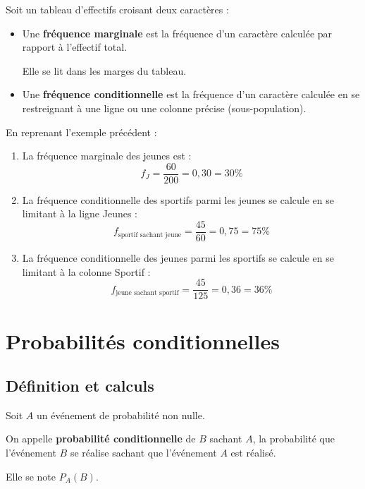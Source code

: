 \begin{defin}
	Soit un tableau d'effectifs croisant deux caractères :
	\begin{itemize}
		\item Une \textbf{fréquence marginale} est la fréquence d'un caractère calculée par rapport à l'effectif total.

		      Elle se lit dans les marges du tableau.
		\item Une \textbf{fréquence conditionnelle} est la fréquence d'un caractère calculée en se restreignant à une ligne ou une colonne précise (sous-population).
	\end{itemize}
\end{defin}

\begin{methode}
	En reprenant l'exemple précédent :
	\begin{enumerate}
		\item La fréquence marginale des jeunes est :
		      \[
			      f_J = \dfrac{60}{200} = 0,30 = 30\%
		      \]
		\item La fréquence conditionnelle des sportifs parmi les jeunes se calcule en se limitant à la ligne \og{}Jeunes\fg{} :
		      \[
			      f_{\text{sportif sachant jeune}} = \dfrac{45}{60} = 0,75 = 75\%
		      \]
		\item La fréquence conditionnelle des jeunes parmi les sportifs se calcule en se limitant à la colonne \og{}Sportif\fg{} :
		      \[
			      f_{\text{jeune sachant sportif}} = \dfrac{45}{125} = 0,36 = 36\%
		      \]
	\end{enumerate}
\end{methode}

\section{Probabilités conditionnelles}

\subsection{Définition et calculs}

\begin{defin}
	Soit $A$ un événement de probabilité non nulle.

	On appelle \textbf{probabilité conditionnelle} de $B$ sachant $A$, la probabilité que l'événement $B$ se réalise sachant que l'événement $A$ est réalisé.

	Elle se note $P_A(B)$.
\end{defin}

